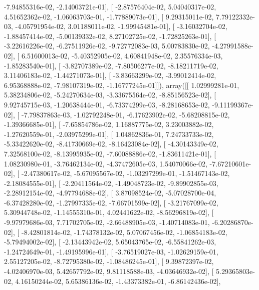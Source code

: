 \documentclass{article}
\begin{document}
         -7.94855316e-02,  -2.14003721e-01],
       [ -2.87576404e-02,   5.04040317e-02,   4.51652362e-02,
         -1.06063703e-01,  -1.77889073e-01],
       [  9.29315011e-02,   7.79122332e-03,  -4.05791954e-02,
          3.01188011e-02,  -1.99945481e-01],
       [ -3.16032704e-02,  -1.88457414e-02,  -5.00139332e-02,
          8.27102725e-02,  -1.72825263e-01],
       [ -3.22616226e-02,  -6.27511926e-02,  -9.72772083e-03,
          5.00783830e-02,  -4.27991588e-02],
       [  6.51600013e-02,  -5.40352905e-02,   4.60841948e-02,
          2.35576334e-03,  -1.85283540e-01],
       [ -3.82707389e-02,  -7.80506277e-02,  -8.18211719e-02,
          3.11406183e-02,  -1.44271073e-01],
       [ -3.83663299e-02,  -3.99012414e-02,   6.95368888e-02,
         -7.98107319e-02,  -1.16777245e-01]]), array([[  1.02999281e-01,   5.38234806e-02,  -5.24270634e-03,
         -3.33675564e-02,  -8.85156523e-02],
       [  9.92745715e-03,  -1.20638444e-01,  -6.73374299e-03,
         -8.28168653e-02,  -9.11199367e-02],
       [ -7.79837863e-03,  -1.02792248e-01,  -6.17623902e-02,
         -5.68208815e-02,  -1.39366685e-01],
       [ -7.65854786e-02,   1.16887775e-02,   3.23003882e-02,
         -1.27620559e-01,  -2.03975299e-01],
       [  1.04862836e-01,   7.24733733e-02,  -5.33422620e-02,
         -8.41730669e-02,  -8.16423084e-02],
       [ -4.30143349e-02,   7.32568100e-02,  -8.13995935e-02,
         -7.60088886e-02,  -1.83611421e-01],
       [  1.08230980e-01,  -3.76462134e-02,  -4.37472605e-03,
          1.54070066e-02,  -7.67210601e-02],
       [ -2.47380617e-02,  -5.67095567e-02,  -1.03297299e-01,
         -1.51467143e-02,  -2.18084555e-01],
       [ -2.20411564e-02,  -1.49048723e-02,  -9.89902855e-03,
         -2.28912154e-02,  -4.97794688e-02],
       [  3.87098524e-02,  -5.07028700e-04,  -6.37428280e-02,
         -1.27997335e-02,  -7.66701599e-02],
       [ -3.21767099e-02,   5.30944748e-02,  -1.14555310e-01,
          4.02441622e-02,  -8.56296819e-02],
       [ -9.97979686e-03,   7.71702705e-02,  -2.66488905e-03,
         -1.40714083e-01,  -6.20286870e-02],
       [ -8.42801814e-02,  -1.74378132e-02,   5.07067456e-02,
         -1.06854183e-02,  -5.79494002e-02],
       [ -2.13443942e-02,   5.65043765e-02,  -6.55841262e-03,
         -1.24724649e-01,  -1.49195996e-01],
       [ -3.76519027e-03,  -1.02629159e-01,   2.55127205e-02,
         -8.72795380e-02,  -1.08486245e-01],
       [  9.39872397e-02,  -4.02406970e-03,   5.42657792e-02,
          9.81118588e-03,  -4.03646932e-02],
       [  5.29365803e-02,   4.16150244e-02,   5.65386136e-02,
         -1.43373382e-01,  -6.86142436e-02],
\end{document}
